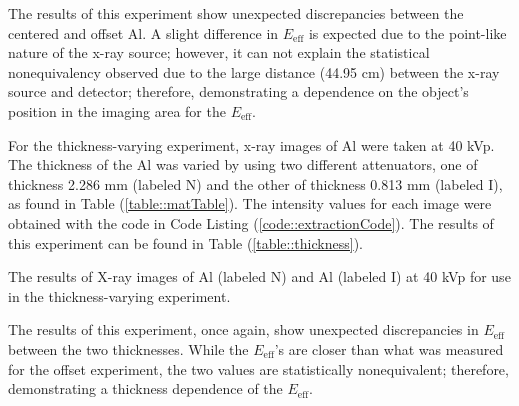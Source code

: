 The results of this experiment show unexpected discrepancies between the centered and offset Al. A slight difference in $E_{\text{eff}}$ is expected due to the point-like nature of the x-ray source; however, it can not explain the statistical nonequivalency observed due to the large distance (44.95 cm)\cite{CArm} between the x-ray source and detector; therefore, demonstrating a dependence on the object's position in the imaging area for the $E_{\text{eff}}$.


For the thickness-varying experiment, x-ray images of Al were taken at 40 kVp. The thickness of the Al was varied by using two different attenuators, one of thickness 2.286 mm (labeled N) and the other of thickness 0.813 mm (labeled I), as found in Table (\ref{table::matTable}). The intensity values for each image were obtained with the code in Code Listing (\ref{code::extractionCode}). The results of this experiment can be found in Table (\ref{table::thickness}).

\begin{table}[H]
    \small
    \noindent\makebox[\textwidth]{%
    
    }
    \caption{The results of X-ray images of Al (labeled N) and Al (labeled I) at 40 kVp for use in the thickness-varying experiment.}
   	\label{table::thickness}
\end{table}

The results of this experiment, once again, show unexpected discrepancies in $E_{\text{eff}}$ between the two thicknesses. While the $E_{\text{eff}}$'s are closer than what was measured for the offset experiment, the two values are statistically nonequivalent; therefore, demonstrating a thickness dependence of the $E_{\text{eff}}$.
















